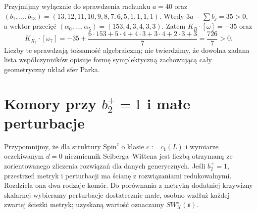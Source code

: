 \begin{przyklad}
Przyjmijmy wyłącznie do sprawdzenia rachunku
$a=40$ oraz $(b_1,\ldots,b_{13})=(13,12,11,10,9,8,7,6,5,1,1,1,1)$.
Wtedy $3a-\sum b_j=35>0$, a wektor przecięć
$(\alpha_0,\ldots,\alpha_5)=(153,4,3,4,3,3)$.
Zatem $K_R\cdot[\omega]=-35$ oraz
\[
K_{X_7}\cdot[\omega_7]
 =-35+\frac{6\cdot153+5\cdot4+4\cdot3
                    +3\cdot4+2\cdot3+3}{7}
 =\frac{726}{7}>0.
\]
Liczby te sprawdzają tożsamość algebraiczną;
nie twierdzimy, że dowolna zadana lista współczynników
opisuje formę symplektyczną zachowującą cały geometryczny
układ sfer Parka.
\end{przyklad}

\begin{center}
\end{center}

\section{Komory przy \texorpdfstring{$b_2^+=1$}{b2+=1} i małe perturbacje}
\label{sec:tg-park14-chamber}

Przypomnijmy, że dla struktury $\mathrm{Spin}^c$ o klasie
$c:=c_1(L)$ i wymiarze oczekiwanym $d=0$ niezmiennik
Seiberga--Wittena jest liczbą otrzymaną ze zorientowanego
zliczenia rozwiązań dla danych generycznych. Jeśli $b_2^+=1$,
przestrzeń metryk i perturbacji ma ścianę z rozwiązaniami
redukowalnymi. Rozdziela ona dwa rodzaje komór.
Do porównania z metryką dodatniej krzywizny skalarnej
wybieramy perturbacje dostatecznie małe, osobno wzdłuż
każdej zwartej ścieżki metryk; uzyskaną wartość oznaczamy
$SW^{\circ}_X(\mathfrak s)$.


